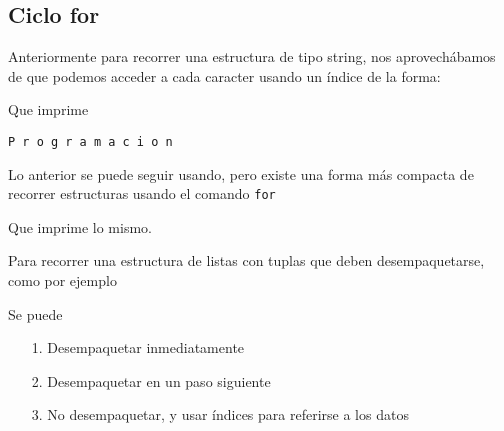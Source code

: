 \subsection*{Ciclo for}

Anteriormente para recorrer una estructura de tipo string, nos aprovechábamos de que podemos acceder a cada caracter usando un índice de la forma:

Que imprime
\begin{lstlisting}[style=consola]
P r o g r a m a c i o n
\end{lstlisting}

Lo anterior se puede seguir usando, pero existe una forma más compacta de recorrer estructuras usando el comando \texttt{for}


Que imprime lo mismo.

Para recorrer una estructura de listas con tuplas que deben desempaquetarse, como por ejemplo

Se puede
\begin{itemize}
    \item[1.] Desempaquetar inmediatamente 
    
    \item[2.] Desempaquetar en un paso siguiente
    
    \item[3.] No desempaquetar, y usar índices para referirse a los datos
\end{itemize}
